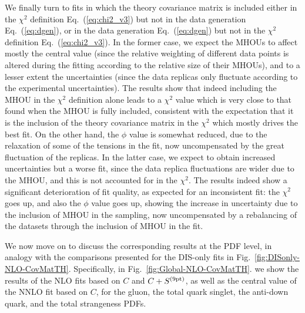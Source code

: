We finally turn to fits in which the theory covariance matrix is
included either in the $\chi^2$ 
  definition Eq.~(\ref{eq:chi2_v3}) but not
  in the data generation Eq.~(\ref{eq:dgen}), 
  or in the data generation Eq.~(\ref{eq:dgen}) but not in the $\chi^2$ 
  definition Eq.~(\ref{eq:chi2_v3}).   In the former case, we 
expect the MHOUs to affect mostly the central value (since the relative weighting of different data points is altered during the fitting according to the relative size of their MHOUs), and to a lesser extent the
uncertainties (since the data
replicas only fluctuate according to the experimental uncertainties). 
The results show that indeed including the MHOU in the $\chi^2$
definition alone  leads to a 
$\chi^2$ value which is very close to that found when the MHOU is fully
included, consistent with the expectation that it is the inclusion of
the theory covariance matrix in the $\chi^2$ which mostly drives the best
fit.
On the other hand, the $\phi$ value is somewhat reduced, due
to the relaxation of some of the tensions in the fit, now
uncompensated by the great fluctuation of the replicas.
In the latter case, we expect to obtain increased uncertainties but a worse fit,
since the data replica fluctuations are wider due to the MHOU, and this is 
not accounted for in the $\chi^2$. The results indeed 
show a significant deterioration of fit quality, as expected for an 
inconsistent fit: the $\chi^2$ goes up, and also the $\phi$ value 
goes up, showing the increase in
uncertainty due to the inclusion of MHOU in the sampling, now uncompensated 
by a rebalancing of the datasets through the inclusion of MHOU in the fit.






We now move on to discuss the corresponding
results at the PDF level, in analogy with
the comparisons presented for the DIS-only fits
in Fig.~\ref{fig:DISonly-NLO-CovMatTH}. Specifically, in 
Fig.~\ref{fig:Global-NLO-CovMatTH}.
we show the results of the NLO fits based on $C$ and $C+S^{\rm
(9pt)}$, as well as the central value of the NNLO fit based on $C$, 
for the gluon, the total quark singlet,
the anti-down quark, and the total strangeness PDFs.




